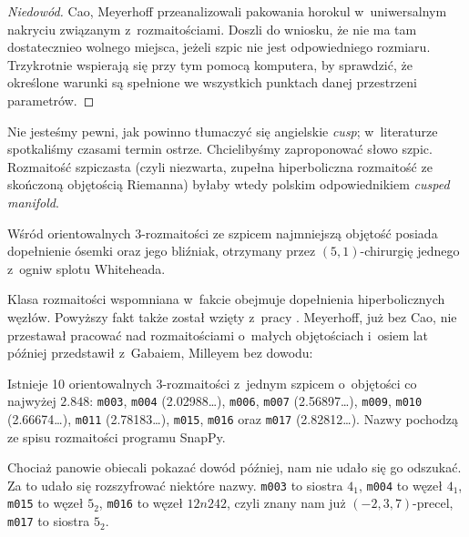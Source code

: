 \begin{proof}[Niedowód]
%
%
    Cao, Meyerhoff \cite{cao2001} przeanalizowali pakowania horokul w~uniwersalnym nakryciu związanym z~rozmaitościami.
    Doszli do wniosku, że nie ma tam dostatecznieo wolnego miejsca, jeżeli szpic nie jest odpowiedniego rozmiaru.
%
    Trzykrotnie wspierają się przy tym pomocą komputera, by sprawdzić, że określone warunki są spełnione we wszystkich punktach danej przestrzeni parametrów.
\end{proof}

Nie jesteśmy pewni, jak powinno tłumaczyć się  angielskie \emph{cusp}; w~literaturze spotkaliśmy czasami termin ostrze.
%
Chcielibyśmy zaproponować słowo szpic.
Rozmaitość szpiczasta (czyli niezwarta, zupełna hiperboliczna rozmaitość ze skończoną objętością Riemanna) byłaby wtedy polskim odpowiednikiem \emph{cusped manifold}.

\begin{proposition}
%
    Wśród orientowalnych 3-rozmaitości ze szpicem najmniejszą objętość posiada dopełnienie ósemki oraz jego bliźniak, otrzymany przez $(5, 1)$-chirurgię jednego z~ogniw splotu Whiteheada.
%
\end{proposition}

Klasa rozmaitości wspomniana w~fakcie obejmuje dopełnienia hiperbolicznych węzłów.
Powyższy fakt także został wzięty z~pracy \cite{cao2001}.
Meyerhoff, już bez Cao, nie przestawał pracować nad rozmaitościami o~małych objętościach i~osiem lat później przedstawił z~Gabaiem, Milleyem \cite{meyerhoff2009} bez dowodu:
%
%

\begin{proposition}
%
    Istnieje 10 orientowalnych 3-rozmaitości z~jednym szpicem o~objętości co najwyżej $2.848$: \texttt{m003}, \texttt{m004} (2.02988\ldots), \texttt{m006}, \texttt{m007} (2.56897\ldots), \texttt{m009}, \texttt{m010} (2.66674\ldots), \texttt{m011} (2.78183\ldots), \texttt{m015}, \texttt{m016} oraz \texttt{m017} (2.82812\ldots).
    Nazwy pochodzą ze spisu rozmaitości programu SnapPy.
\end{proposition}

Chociaż panowie obiecali pokazać dowód później, nam nie udało się go odszukać.
Za to udało się rozszyfrować niektóre nazwy.
\texttt{m003} to siostra $4_1$, %
\texttt{m004} to węzeł $4_1$, %
\texttt{m015} to węzeł $5_2$,
\texttt{m016} to węzeł $12n242$, czyli znany nam już $(-2, 3, 7)$-precel,
%
\texttt{m017} to siostra $5_2$. %


